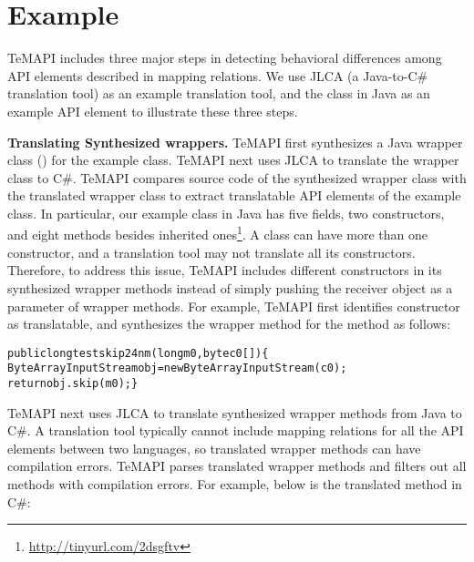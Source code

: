 \section{Example}
\label{sec:example}

TeMAPI includes three major steps in detecting behavioral differences among API elements described in mapping relations. We use JLCA (a Java-to-C\# translation tool) as an example translation tool, and the  class in Java as an example API element to illustrate these three steps.

\textbf{Translating Synthesized wrappers.} TeMAPI first synthesizes a Java wrapper class () for the example class. TeMAPI next uses JLCA to translate the wrapper class to C\#. TeMAPI compares source code of the synthesized wrapper class with the translated wrapper class to extract translatable API elements of the example class. In particular, our example class in Java has five fields, two constructors, and eight methods besides inherited ones\footnote{\url{http://tinyurl.com/2dsgftv}}. A class can have more than one constructor, and a translation tool may not translate all its constructors. Therefore, to address this issue, TeMAPI includes different constructors in its synthesized wrapper methods instead of simply pushing the receiver object as a parameter of wrapper methods. For example, TeMAPI first identifies  constructor as translatable, and synthesizes the wrapper method for the  method as follows:

\begin{CodeOut}\vspace*{-1.5ex}
\begin{alltt}
public long testskip24nm(long m0, byte c0[])\{
  ByteArrayInputStream obj = new ByteArrayInputStream(c0);
  return obj.skip(m0);\}
\end{alltt}
\end{CodeOut}\vspace*{-2ex}

TeMAPI next uses JLCA to translate synthesized wrapper methods from Java to C\#. A translation tool typically cannot include mapping relations for all the API elements between two languages, so translated wrapper methods can have compilation errors. TeMAPI parses translated wrapper methods and filters out all methods with compilation errors. For example, below is the translated  method in C\#:

